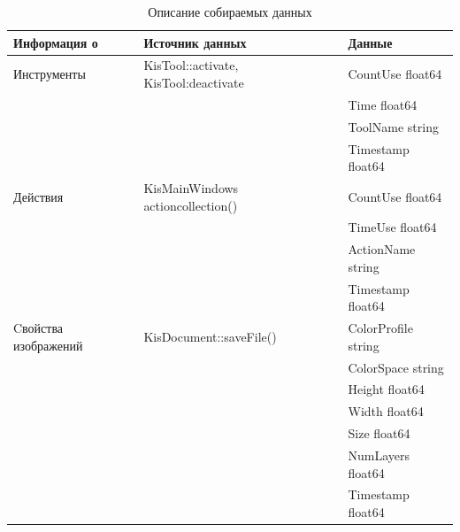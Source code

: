 \begin{table}[!h]

\caption{\label{tab:collectdata}Описание собираемых данных}

\begin{center}

\begin{tabular}{|l|l|l|}

\hline

Информация о & Источник данных & Данные \\

\hline \hline

Инструменты & KisTool::activate, KisTool:deactivate & 

CountUse float64 

\tabularnewline & & Time     float64 

\tabularnewline & & ToolName string 

\tabularnewline & & Timestamp     float64 \\


\hline

Действия & 

KisMainWindows actioncollection()

& 

CountUse float64 

\tabularnewline & & TimeUse      float64 

\tabularnewline & & ActionName string 

\tabularnewline & & Timestamp     float64 \\


\hline

Cвойства изображений & 

KisDocument::saveFile()

& 

ColorProfile string 

\tabularnewline & &  ColorSpace   string 

\tabularnewline & & Height       float64 

\tabularnewline & & Width      float64

\tabularnewline & & Size      float64 

\tabularnewline & & NumLayers      float64 

\tabularnewline & & Timestamp     float64 \\


\hline


\end{tabular}

\end{center}

\end{table}
